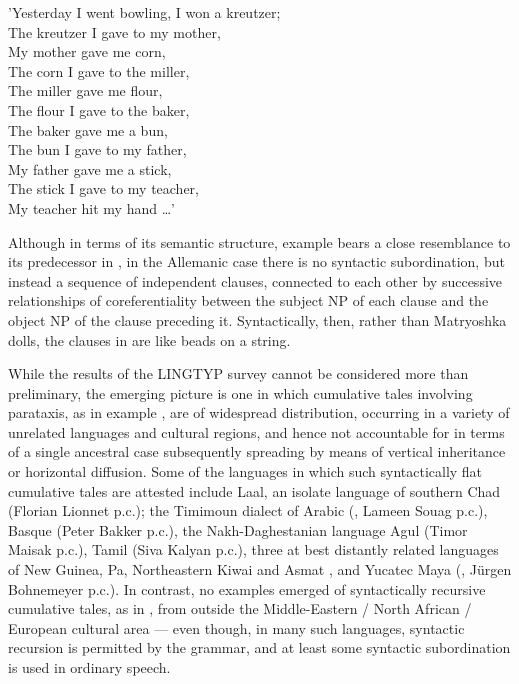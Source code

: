 \documentclass[output=paper,colorlinks,citecolor=brown
]{langscibook}
\begin{document}
'Yesterday I went bowling, I won a kreutzer;\\
The kreutzer I gave to my mother, \\
My mother gave me corn, \\
The corn I gave to the miller, \\
The miller gave me flour, \\
The flour I gave to the baker, \\
The baker gave me a bun, \\
The bun I gave to my father, \\
My father gave me a stick, \\
The stick I gave to my teacher, \\
My teacher hit my hand  \ldots ' \\

\z

Although in terms of its semantic structure, example  bears a close resemblance to its predecessor in , in the Allemanic case there is no syntactic subordination, but instead a sequence of independent clauses, connected to each other by successive relationships of coreferentiality between the subject NP of each clause and the object NP of the clause preceding it.  Syntactically, then, rather than Matryoshka dolls, the clauses in  are like beads on a string.

While the results of the LINGTYP survey cannot be considered more than preliminary, the emerging picture is one in which cumulative tales involving parataxis, as in example , are of widespread distribution, occurring in a variety of unrelated languages and cultural regions, and hence not accountable for in terms of a single ancestral case subsequently spreading by means of vertical inheritance or horizontal diffusion.  Some of the languages in which such syntactically flat cumulative tales are attested include Laal, an isolate language of southern Chad (Florian Lionnet p.c.); the Timimoun dialect of Arabic (\cite{mammeri1985ahellil}, Lameen Souag p.c.), Basque (Peter Bakker p.c.), the Nakh-Daghestanian language Agul (Timor Maisak p.c.), Tamil (Siva Kalyan p.c.), three at best distantly related languages of New Guinea, Pa, Northeastern Kiwai and Asmat \citep{voorhoeve2010remarkable}, and Yucatec Maya (\cite[180—186]{smailus1975textos}, Jürgen Bohnemeyer p.c.).  In contrast, no examples emerged of syntactically recursive cumulative tales, as in , from outside the Middle-Eastern / North African / European cultural area — even though, in many such languages, syntactic recursion is permitted by the grammar, and at least some syntactic subordination is used in ordinary speech.  
\end{document}
